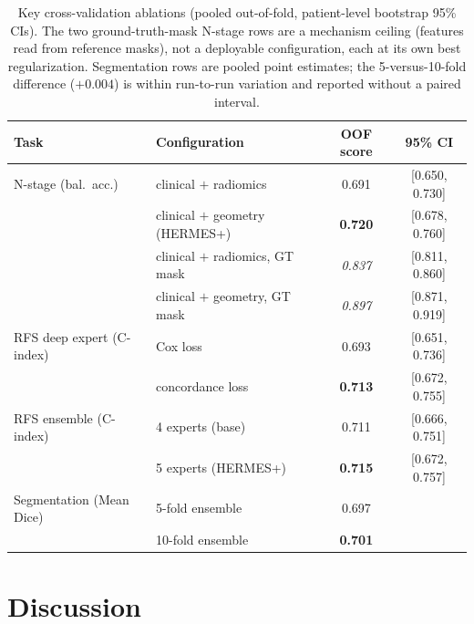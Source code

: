 \documentclass[runningheads]{llncs}
\begin{document}
\begin{table}[t]
\centering
\caption{Key cross-validation ablations (pooled out-of-fold, patient-level bootstrap 95\% CIs). The two ground-truth-mask N-stage rows are a mechanism ceiling (features read from reference masks), not a deployable configuration, each at its own best regularization. Segmentation rows are pooled point estimates; the 5-versus-10-fold difference ($+0.004$) is within run-to-run variation and reported without a paired interval.}
\label{tab:abl}
\small
\begin{tabular}{llcc}
\toprule
Task & Configuration & OOF score & 95\% CI \\
\midrule
N-stage (bal.\ acc.) & clinical $+$ radiomics & 0.691 & [0.650, 0.730] \\
 & clinical $+$ geometry (HERMES+) & \textbf{0.720} & [0.678, 0.760] \\
 & clinical $+$ radiomics, GT mask & \textit{0.837} & [0.811, 0.860] \\
 & clinical $+$ geometry, GT mask & \textit{0.897} & [0.871, 0.919] \\
\midrule
RFS deep expert (C-index) & Cox loss & 0.693 & [0.651, 0.736] \\
 & concordance loss & \textbf{0.713} & [0.672, 0.755] \\
\midrule
RFS ensemble (C-index) & 4 experts (base) & 0.711 & [0.666, 0.751] \\
 & 5 experts (HERMES+) & \textbf{0.715} & [0.672, 0.757] \\
\midrule
Segmentation (Mean Dice) & 5-fold ensemble & 0.697 & \\
 & 10-fold ensemble & \textbf{0.701} & \\
\bottomrule
\end{tabular}
\end{table}

\section{Discussion}
\label{sec:discussion}
\end{document}
